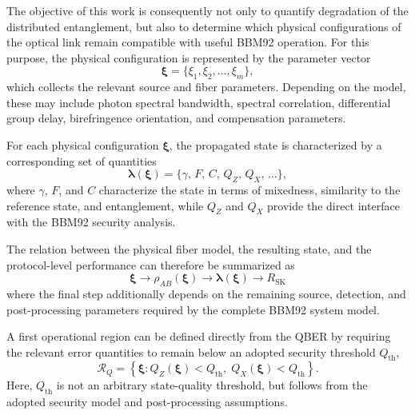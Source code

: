 The objective of this work is consequently not only to quantify degradation of the distributed entanglement, but also to determine which physical configurations of the optical link remain compatible with useful BBM92 operation. For this purpose, the physical configuration is represented by the parameter vector
\begin{equation}
\boldsymbol{\xi}
=
\{
\xi_1,\xi_2,\ldots,\xi_m
\},
\label{eq:physical_parameter_vector}
\end{equation}
which collects the relevant source and fiber parameters. Depending on the model, these may include photon spectral bandwidth, spectral correlation, differential group delay, birefringence orientation, and compensation parameters.

For each physical configuration \(\boldsymbol{\xi}\), the propagated state is characterized by a corresponding set of quantities
\begin{equation}
\boldsymbol{\lambda}(\boldsymbol{\xi})
=
\{
\gamma,\,
F,\,
C,\,
Q_Z,\,
Q_X,\,
\ldots
\},
\label{eq:state_metric_vector}
\end{equation}
where \(\gamma\), \(F\), and \(C\) characterize the state in terms of mixedness, similarity to the reference state, and entanglement, while \(Q_Z\) and \(Q_X\) provide the direct interface with the BBM92 security analysis.

The relation between the physical fiber model, the resulting state, and the protocol-level performance can therefore be summarized as
\begin{equation}
\boxed{
\boldsymbol{\xi}
\longrightarrow
\rho_{AB}(\boldsymbol{\xi})
\longrightarrow
\boldsymbol{\lambda}(\boldsymbol{\xi})
\longrightarrow
R_{\mathrm{SK}}
}
\label{eq:physical_to_operational_mapping}
\end{equation}
where the final step additionally depends on the remaining source, detection, and post-processing parameters required by the complete BBM92 system model.

A first operational region can be defined directly from the QBER by requiring the relevant error quantities to remain below an adopted security threshold \(Q_{\mathrm{th}}\),
\begin{equation}
\mathcal{R}_{Q}
=
\left\{
\boldsymbol{\xi}
:
Q_Z(\boldsymbol{\xi})<Q_{\mathrm{th}},
\;
Q_X(\boldsymbol{\xi})<Q_{\mathrm{th}}
\right\}.
\label{eq:bbm92_qber_operating_region}
\end{equation}
Here, \(Q_{\mathrm{th}}\) is not an arbitrary state-quality threshold, but follows from the adopted security model and post-processing assumptions.

